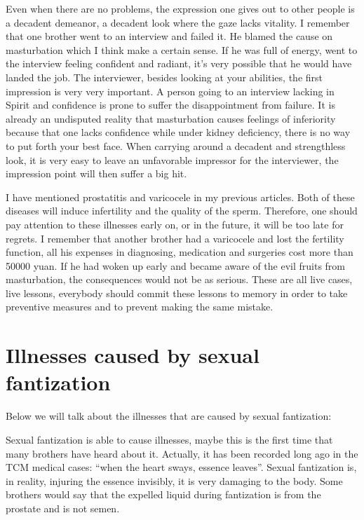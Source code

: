 \documentclass[
]{book}
\begin{document}
Even when there are no problems, the expression one gives out to other people is a decadent demeanor, a decadent look where the gaze lacks vitality. I remember that one brother went to an interview and failed it. He blamed the cause on masturbation which I think make a certain sense. If he was full of energy, went to the interview feeling confident and radiant, it's very possible that he would have landed the job. The interviewer, besides looking at your abilities, the first impression is very very important. A person going to an interview lacking in Spirit and confidence is prone to suffer the disappointment from failure. It is already an undisputed reality that masturbation causes feelings of inferiority because that one lacks confidence while under kidney deficiency, there is no way to put forth your best face. When carrying around a decadent and strengthless look, it is very easy to leave an unfavorable impressor for the interviewer, the impression point will then suffer a big hit.

I have mentioned prostatitis and varicocele in my previous articles. Both of these diseases will induce infertility and the quality of the sperm. Therefore, one should pay attention to these illnesses early on, or in the future, it will be too late for regrets. I remember that another brother had a varicocele and lost the fertility function, all his expenses in diagnosing, medication and surgeries cost more than 50000 yuan. If he had woken up early and became aware of the evil fruits from masturbation, the consequences would not be as serious. These are all live cases, live lessons, everybody should commit these lessons to memory in order to take preventive measures and to prevent making the same mistake.

\hypertarget{illnesses-caused-by-sexual-fantization}{%
\section{Illnesses caused by sexual fantization}\label{illnesses-caused-by-sexual-fantization}}

Below we will talk about the illnesses that are caused by sexual fantization:

Sexual fantization is able to cause illnesses, maybe this is the first time that many brothers have heard about it. Actually, it has been recorded long ago in the TCM medical cases: ``when the heart sways, essence leaves''. Sexual fantization is, in reality, injuring the essence invisibly, it is very damaging to the body. Some brothers would say that the expelled liquid during fantization is from the prostate and is not semen.
\end{document}
